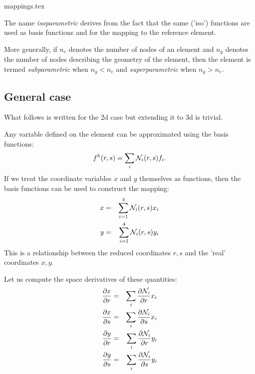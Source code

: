 \begin{flushright} {\tiny {\color{gray} mappings.tex}} \end{flushright}


The name {\sl isoparametric} derives from the fact that the same ('iso') 
functions are used as basis functions and for the mapping to the reference element.

More generally, if $n_e$ denotes the number of nodes of an element and $n_g$ denotes the 
number of nodes describing the geometry of the element, 
then the element is termed {\sl subparametric} when $n_g<n_e$ and 
{\sl superparametric} when $n_g>n_e$.

\subsection{General case}

What follows is written for the 2d case but extending it to 3d is trivial.

Any variable defined on the element can be approximated using the basis functions:
\begin{equation}
f^h(r,s)=\sum_i {\mathcal{N}}_i(r,s) f_i.
\end{equation}
If we treat the coordinate variables $x$ and $y$ themselves as functions, 
then the basis functions can be used to construct the mapping:
\begin{eqnarray}
x &=& \sum_{i=1}^4 {\mathcal{N}}_i(r,s) x_i \\
y &=& \sum_{i=1}^4 {\mathcal{N}}_i(r,s) y_i 
\end{eqnarray}
This is a relationship between the reduced coordinates $r,s$ and the 'real'
coordinates $x,y$.

Let us compute the space derivatives of these quantities:
\begin{eqnarray}
\frac{\partial x}{\partial r} &=& \sum_i \frac{\partial {\mathcal{N}}_i}{\partial r} x_i \\
\frac{\partial x}{\partial s} &=& \sum_i \frac{\partial {\mathcal{N}}_i}{\partial s} x_i \\
\frac{\partial y}{\partial r} &=& \sum_i \frac{\partial {\mathcal{N}}_i}{\partial r} y_i \\
\frac{\partial y}{\partial s} &=& \sum_i \frac{\partial {\mathcal{N}}_i}{\partial s} y_i 
\end{eqnarray}


